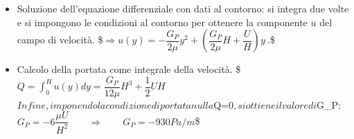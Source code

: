 \documentclass[letterpaper,10pt,italian]{jupyterBook}
\begin{document}
\begin{itemize}
\item {} 
\sphinxAtStartPar
Soluzione dell’equazione differenziale con dati al contorno: si
integra due volte e si impongono le condizioni al contorno per
ottenere la componente \(u\) del campo di velocità.
\$\(\Rightarrow u(y) = -\dfrac{G_P}{2 \mu} y^2 + \left( \dfrac{G_P}{2 \mu}H
    + \dfrac{U}{H} \right) y \ .\)\$

\item {} 
\sphinxAtStartPar
Calcolo della portata come integrale della velocità.
\$\(Q = \int_{0}^{H} u(y) dy = \dfrac{G_P}{12 \mu} H^3 + \dfrac{1}{2} U H\)\(
Infine, imponendo la condizione di portata nulla \)Q=0\(, si ottiene
il valore di \)G\_P\(:
\)\(G_P = -6\dfrac{\mu U}{H^2} \qquad \Rightarrow \qquad G_P = - 930 Pa/m\)\$

\end{itemize}

\sphinxstepscope
\end{document}
